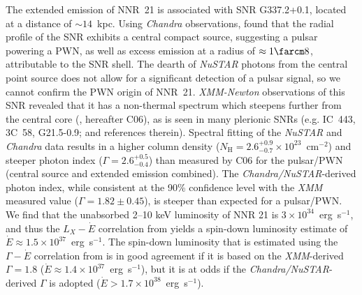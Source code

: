 \documentclass[iop,revtex4]{emulateapj}
\begin{document}
The extended emission of NNR~21 is associated with SNR G337.2+0.1, located at a distance of $\sim14$~kpc. Using \textit{Chandra} observations, \citet{jakobsen13} found that the radial profile of the SNR exhibits a central compact source, suggesting a pulsar powering a PWN, as well as excess emission at a radius of $\approx 1\farcm8$, attributable to the SNR shell.  The dearth of \textit{NuSTAR} photons from the central point source does not allow for a significant detection of a pulsar signal, so we cannot confirm the PWN origin of NNR~21.  \textit{XMM-Newton} observations of this SNR revealed that it has a non-thermal spectrum which steepens further from the central core (\citealt{combi06}, hereafter C06), as is seen in many plerionic SNRs (e.g. IC~443, 3C~58, G21.5-0.9; \citealt{bocchino01} and references therein).  Spectral fitting of the \textit{NuSTAR} and \textit{Chandra} data results in a higher column density ($N_{\mathrm{H}} = 2.6^{+0.9}_{-0.7}\times10^{23}$~cm$^{-2}$) and steeper photon index ($\Gamma = 2.6^{+0.5}_{-0.4}$) than measured by C06 for the pulsar/PWN (central source and extended emission combined).  The \textit{Chandra/NuSTAR}-derived photon index, while consistent at the 90\% confidence level with the \textit{XMM} measured value ($\Gamma = 1.82\pm0.45$), is steeper than expected for a pulsar/PWN.  We find that the unabsorbed 2--10 keV luminosity of NNR 21 is $3\times10^{34}$~erg~s$^{-1}$, and thus the $L_X-\dot{E}$ correlation from \citet{possenti02} yields a spin-down luminosity estimate of $\dot{E}\approx1.5\times10^{37}$~erg~s$^{-1}$.  The spin-down luminosity that is estimated using the $\Gamma-\dot{E}$ correlation from \citet{gotthelf03} is in good agreement if it is based on the \textit{XMM}-derived $\Gamma=1.8$ ($\dot{E}\approx1.4\times10^{37}$~erg~s$^{-1}$), but it is at odds if the \textit{Chandra/NuSTAR}-derived $\Gamma$ is adopted ($\dot{E}>1.7\times10^{38}$~erg~s$^{-1}$).\footnotemark{}  \par
\end{document}
